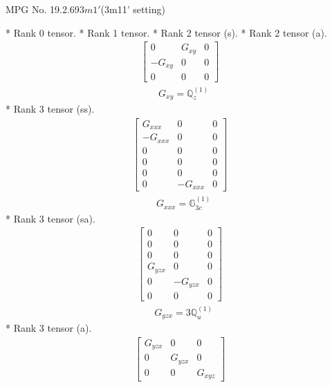 \documentclass[fleqn,8pt,landscape]{jsarticle}
\begin{document}
\setcounter{MaxMatrixCols}{32}

\renewcommand{\tablename}{Table~}
\renewcommand{\figurename}{Figure~}
\begin{center}
\LARGE
MPG No. 19.2.69\quad$3m1'$\quad(3m11' setting)
\end{center}
* Rank 0 tensor.
* Rank 1 tensor.
* Rank 2 tensor (s).
* Rank 2 tensor (a).
\begin{align*}
\begin{bmatrix} 0 & G_{xy} & 0 \\ - G_{xy} & 0 & 0 \\ 0 & 0 & 0 \end{bmatrix}
\end{align*}
\begin{align*}
& G_{xy} = \mathbb{Q}_{z}^{(1)}
\end{align*}
* Rank 3 tensor (ss).
\begin{align*}
\begin{bmatrix} G_{xxx} & 0 & 0 \\ - G_{xxx} & 0 & 0 \\ 0 & 0 & 0 \\ 0 & 0 & 0 \\ 0 & 0 & 0 \\ 0 & - G_{xxx} & 0 \end{bmatrix}
\end{align*}
\begin{align*}
& G_{xxx} = \mathbb{G}_{3c}^{(1)}
\end{align*}
* Rank 3 tensor (sa).
\begin{align*}
\begin{bmatrix} 0 & 0 & 0 \\ 0 & 0 & 0 \\ 0 & 0 & 0 \\ G_{yzx} & 0 & 0 \\ 0 & - G_{yzx} & 0 \\ 0 & 0 & 0 \end{bmatrix}
\end{align*}
\begin{align*}
& G_{yzx} = 3 \mathbb{Q}_{u}^{(1)}
\end{align*}
* Rank 3 tensor (a).
\begin{align*}
\begin{bmatrix} G_{yzx} & 0 & 0 \\ 0 & G_{yzx} & 0 \\ 0 & 0 & G_{xyz} \end{bmatrix}
\end{align*}
\end{document}
